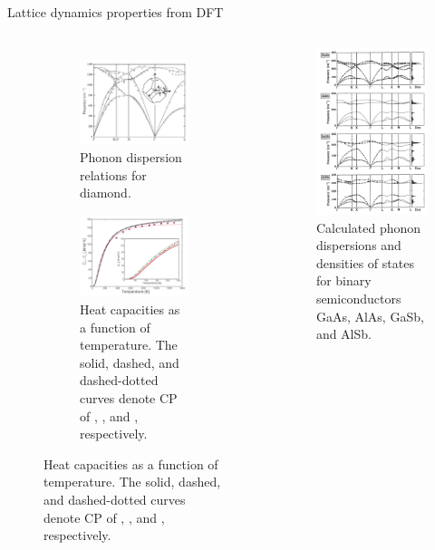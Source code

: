 \documentclass[aspectratio=169]{beamer}
\begin{document}
\begin{frame}{Lattice dynamics properties from DFT}

\begin{columns}

\begin{figure}
    \centering
    \begin{subfigure}{\textwidth}
        \centering
        \includegraphics[width=0.4\linewidth]{lectures/figures/10_Phonon_Diamond.png}
    \caption{Phonon dispersion relations for diamond.\cite{gonzeFirstprincipleStudiesLattice2005}}
    \end{subfigure}
    \begin{subfigure}{\textwidth}
        \centering
        \includegraphics[width=0.3\linewidth]{lectures/figures/10_Heat_capacities.png}
    \caption{Heat capacities as a function of temperature. The solid, dashed, and dashed-dotted curves denote CP of , , and , respectively.\cite{togoFirstprinciplesPhononCalculations2010}}
    \end{subfigure}
\end{figure}

\begin{figure}
    \centering
    \includegraphics[width=0.45\linewidth]{lectures/figures/10_Phonon_Semiconductors.png}
    \caption{Calculated phonon dispersions and densities of states for binary semiconductors GaAs, AlAs, GaSb, and AlSb.\cite{baroniPhononsRelatedCrystal2001}}


\end{figure}
\end{columns}
\end{frame}
\end{document}
